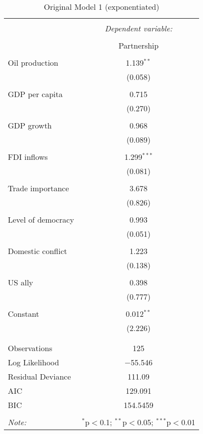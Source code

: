 \documentclass[12pt,letterpaper]{article}
\begin{document}
\begin{table}[H] \centering 
  \caption{Original Model 1 (exponentiated)} 
  \label{} 
\begin{tabular}{@{\extracolsep{5pt}}lc} 
\\[-1.8ex]\hline 
\hline \\[-1.8ex] 
 & \multicolumn{1}{c}{\textit{Dependent variable:}} \\ 
\cline{2-2} 
\\[-1.8ex] & Partnership \\ 
\hline \\[-1.8ex] 
 Oil production & 1.139$^{**}$ \\ 
  & (0.058) \\ 
  & \\ 
 GDP per capita & 0.715 \\ 
  & (0.270) \\ 
  & \\ 
 GDP growth & 0.968 \\ 
  & (0.089) \\ 
  & \\ 
 FDI inflows & 1.299$^{***}$ \\ 
  & (0.081) \\ 
  & \\ 
 Trade importance & 3.678 \\ 
  & (0.826) \\ 
  & \\ 
 Level of democracy & 0.993 \\ 
  & (0.051) \\ 
  & \\ 
 Domestic conflict & 1.223 \\ 
  & (0.138) \\ 
  & \\ 
 US ally & 0.398 \\ 
  & (0.777) \\ 
  & \\ 
 Constant & 0.012$^{**}$ \\ 
  & (2.226) \\ 
  & \\ 
\hline \\[-1.8ex] 
Observations & 125 \\ 
Log Likelihood & $-$55.546 \\ 
Residual Deviance & 111.09 \\
AIC & 129.091 \\ 
BIC & 154.5459 \\ 
\hline 
\hline \\[-1.8ex] 
\textit{Note:}  & \multicolumn{1}{r}{$^{*}$p$<$0.1; $^{**}$p$<$0.05; $^{***}$p$<$0.01} \\ 
\end{tabular} 
\end{table} 
\end{document}

